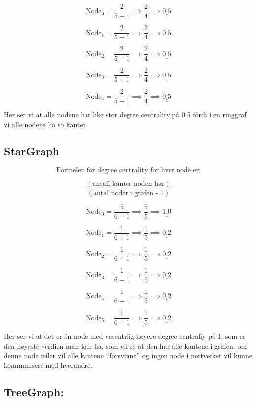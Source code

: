 \documentclass[11pt]{article}
\begin{document}
\[\text{Node}_0 = \frac{2}{5 - 1} \implies \frac{2}{4} \implies \underline{\underline{ 0.5}}\]

\[\text{Node}_1 = \frac{2}{5 - 1} \implies \frac{2}{4} \implies \underline{\underline{ 0.5}}\]

\[\text{Node}_2 = \frac{2}{5 - 1} \implies \frac{2}{4} \implies \underline{\underline{ 0.5}}\]

\[\text{Node}_3 = \frac{2}{5 - 1} \implies \frac{2}{4} \implies \underline{\underline{ 0.5}}\]

\[\text{Node}_4 = \frac{2}{5 - 1} \implies \frac{2}{4} \implies \underline{\underline{ 0.5}}\]

Her ser vi at alle nodene har like stor degree centrality på 0.5 fordi i
en ringgraf vi alle nodene ha to kanter.

    \hypertarget{stargraph}{%
\subsection*{StarGraph}\label{stargraph}}

\[\text{Formelen for degree centrality for hver node er:}\]

\[\frac{(\text{antall kanter noden har})}{(\text{antal noder i grafen - 1})}\]

\[\text{Node}_0 = \frac{5}{6 - 1} \implies \frac{5}{5} \implies \underline{\underline{ 1.0}}\]

\[\text{Node}_1 = \frac{1}{6 - 1} \implies \frac{1}{5} \implies \underline{\underline{ 0.2}}\]

\[\text{Node}_2 = \frac{1}{6 - 1} \implies \frac{1}{5} \implies \underline{\underline{ 0.2}}\]

\[\text{Node}_3 = \frac{1}{6 - 1} \implies \frac{1}{5} \implies \underline{\underline{ 0.2}}\]

\[\text{Node}_4 = \frac{1}{6 - 1} \implies \frac{1}{5} \implies \underline{\underline{ 0.2}}\]

\[\text{Node}_5 = \frac{1}{6 - 1} \implies \frac{1}{5} \implies \underline{\underline{ 0.2}}\]

Her ser vi at det er én node med vesentrlig høyere degree centraliy på
1, som er den høyeste verdien man kan ha, som vil se at den har alle
kantene i grafen. om denne node feiler vil alle kantene ``forsvinne'' og
ingen node i nettverket vil kunne kommunisere med hverandre.

    \hypertarget{treegraph}{%
\subsection*{TreeGraph:}\label{treegraph}}
\end{document}
